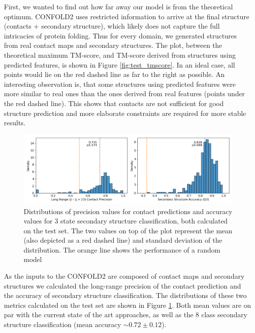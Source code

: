 First, we wanted to find out how far away our model is from the theoretical optimum. CONFOLD2 uses restricted information to arrive at the final structure (contacts + secondary structure), which likely does not capture the full intricacies of protein folding. Thus for every domain, we generated structures from real contact maps and secondary structures. The plot, between the theoretical maximum TM-score, and TM-score derived from structures using predicted features, is shown in Figure \ref{fig:test_tmscore}. In an ideal case, all points would lie on the red dashed line as far to the right as possible. 
An interesting observation is, that some structures using predicted features were more similar to real ones than the ones derived from real features (points under the red dashed line). This shows that contacts are not sufficient for good structure prediction and more elaborate constraints are required for more stable results.

\begin{figure}
    \centering
    \includegraphics[width=\linewidth]{imgs_tomas/long_range_contacts_secondary_eval.png}
    \caption{Distributions of precision values for contact predictions and accuracy values for 3 state secondary structure classification, both calculated on the test set. The two values on top of the plot represent the mean (also depicted as a red dashed line) and standard deviation of the distribution. The orange line shows the performance of a random model}
    \label{fig:contacts_sec}
\end{figure}

As the inputs to the CONFOLD2 are composed of contact maps and secondary structures we calculated the long-range precision of the contact prediction and the accuracy of secondary structure classification. The distributions of these two metrics calculated on the test set are shown in Figure \ref{fig:contacts_sec}. Both mean values are on par with the current state of the art approaches, as well as the 8 class secondary structure classification (mean accuracy $\sim 0.72 \pm 0.12$).

